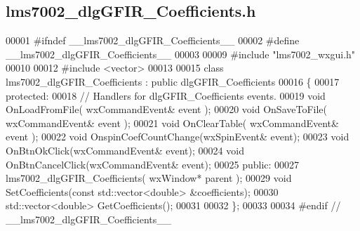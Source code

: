 \subsection{lms7002\+\_\+dlg\+G\+F\+I\+R\+\_\+\+Coefficients.\+h}
\label{lms7002__dlgGFIR__Coefficients_8h_source}

\begin{DoxyCode}
00001 \textcolor{preprocessor}{#ifndef \_\_lms7002\_dlgGFIR\_Coefficients\_\_}
00002 \textcolor{preprocessor}{#define \_\_lms7002\_dlgGFIR\_Coefficients\_\_}
00003 
00009 \textcolor{preprocessor}{#include "lms7002_wxgui.h"}
00010 
00012 \textcolor{preprocessor}{#include <vector>}
00013 
00015 \textcolor{keyword}{class }lms7002_dlgGFIR_Coefficients : \textcolor{keyword}{public} dlgGFIR_Coefficients
00016 \{
00017     \textcolor{keyword}{protected}:
00018         \textcolor{comment}{// Handlers for dlgGFIR\_Coefficients events.}
00019         \textcolor{keywordtype}{void} OnLoadFromFile( wxCommandEvent& event );
00020         \textcolor{keywordtype}{void} OnSaveToFile( wxCommandEvent& event );
00021         \textcolor{keywordtype}{void} OnClearTable( wxCommandEvent& event );
00022         \textcolor{keywordtype}{void} OnspinCoefCountChange(wxSpinEvent& event);
00023         \textcolor{keywordtype}{void} OnBtnOkClick(wxCommandEvent& event);
00024         \textcolor{keywordtype}{void} OnBtnCancelClick(wxCommandEvent& event);
00025     \textcolor{keyword}{public}:
00027         lms7002_dlgGFIR_Coefficients( wxWindow* parent );
00029         \textcolor{keywordtype}{void} SetCoefficients(\textcolor{keyword}{const} std::vector<double> &coefficients);
00030         std::vector<double> GetCoefficients();
00031     
00032 \};
00033 
00034 \textcolor{preprocessor}{#endif // \_\_lms7002\_dlgGFIR\_Coefficients\_\_}
\end{DoxyCode}
